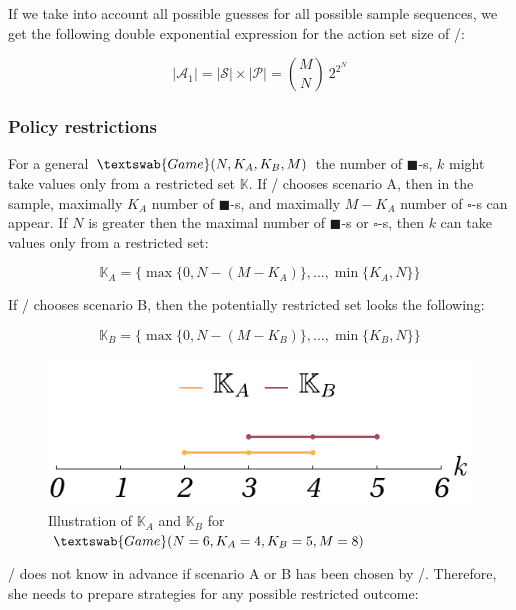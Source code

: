 \documentclass{article}
\newcommand{\wb}{\square}
\newcommand{\bb}{\blacksquare}
\theoremstyle{definition}
\newcommand{\G}[1]{$\textswab{Game}(#1)$}
\begin{document}
If we take into account all possible guesses for all possible sample sequences, we get the following double exponential expression for the action set size of \PI/:


\begin{equation}
    |\mathcal{A}_1| = |\mathcal{S}| \times |\mathcal{P}| = \binom{M}{N} \ 2^{2^N} 
\end{equation}



\subsubsection{Policy restrictions}

For a general \G{N,K_A,K_B,M} the number of $\bb$-s, $k$ might take values only from a restricted set $\mathbb{K}$.
If \PII/ chooses scenario A, then in the sample, maximally $K_A$ number of $\bb$-s, and maximally $M-K_A$ number of $\wb$-s can appear. If $N$ is greater then the maximal number of $\bb$-s or $\wb$-s, then $k$ can take values only from a restricted set:

\begin{equation}
    \mathbb{K}_A = \{ \max\{0,N-(M-K_A)\}, \dots, \min\{K_A,N\} \}
\end{equation}

If \PII/ chooses scenario B, then the potentially restricted set looks the following:

\begin{equation}
    \mathbb{K}_B = \{ \max \{0,N-(M-K_B)\}, \dots, \min \{K_B,N\} \}
\end{equation}

\begin{figure}[H]
    \centering
    \includegraphics{img/KAB.pdf}
    \caption{Illustration of $\mathbb{K}_A$ and $\mathbb{K}_B$ for \G{N=6,K_A=4,K_B=5,M=8}}
    \label{fig:KAB}
\end{figure}

\PI/ does not know in advance if scenario A or B has been chosen by \PII/. Therefore, she needs to prepare strategies for any possible restricted outcome:
\end{document}
